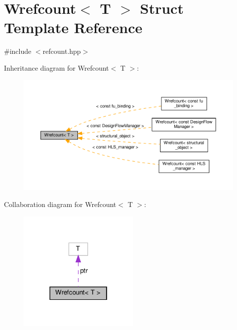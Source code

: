 \hypertarget{classWrefcount}{}\section{Wrefcount$<$ T $>$ Struct Template Reference}
\label{classWrefcount}


{\ttfamily \#include $<$refcount.\+hpp$>$}



Inheritance diagram for Wrefcount$<$ T $>$\+:
\nopagebreak
\begin{figure}[H]
\begin{center}
\leavevmode
\includegraphics[width=350pt]{d9/dd2/classWrefcount__inherit__graph}
\end{center}
\end{figure}


Collaboration diagram for Wrefcount$<$ T $>$\+:
\nopagebreak
\begin{figure}[H]
\begin{center}
\leavevmode
\includegraphics[width=166pt]{d6/d70/classWrefcount__coll__graph}
\end{center}
\end{figure}
